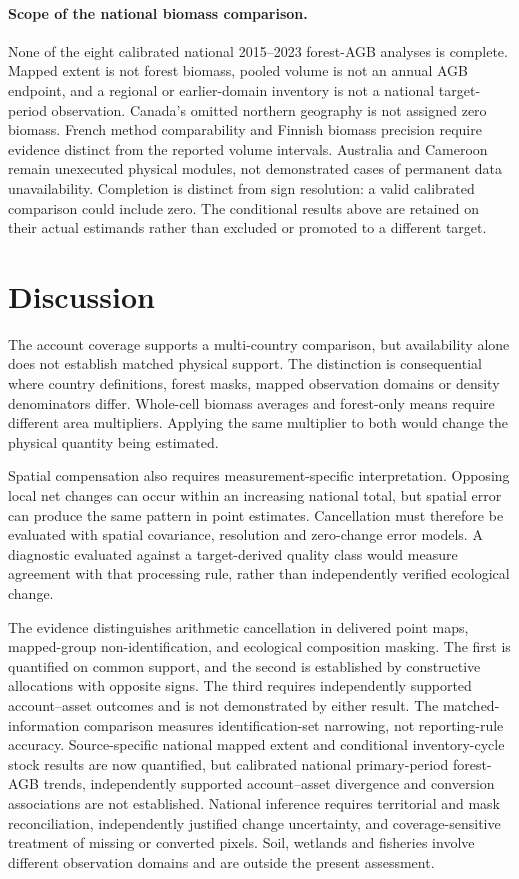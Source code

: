 \documentclass[11pt,a4paper]{article}
\begin{document}
\paragraph{Scope of the national biomass comparison.}
None of the eight calibrated national 2015--2023 forest-AGB analyses is complete. Mapped extent is not forest biomass, pooled volume is not an annual AGB endpoint, and a regional or earlier-domain inventory is not a national target-period observation. Canada's omitted northern geography is not assigned zero biomass. French method comparability and Finnish biomass precision require evidence distinct from the reported volume intervals. Australia and Cameroon remain unexecuted physical modules, not demonstrated cases of permanent data unavailability. Completion is distinct from sign resolution: a valid calibrated comparison could include zero. The conditional results above are retained on their actual estimands rather than excluded or promoted to a different target.

\section{Discussion}
The account coverage supports a multi-country comparison, but availability alone does not establish matched physical support. The distinction is consequential where country definitions, forest masks, mapped observation domains or density denominators differ. Whole-cell biomass averages and forest-only means require different area multipliers. Applying the same multiplier to both would change the physical quantity being estimated.

Spatial compensation also requires measurement-specific interpretation. Opposing local net changes can occur within an increasing national total, but spatial error can produce the same pattern in point estimates. Cancellation must therefore be evaluated with spatial covariance, resolution and zero-change error models. A diagnostic evaluated against a target-derived quality class would measure agreement with that processing rule, rather than independently verified ecological change.

The evidence distinguishes arithmetic cancellation in delivered point maps, mapped-group non-identification, and ecological composition masking. The first is quantified on common support, and the second is established by constructive allocations with opposite signs. The third requires independently supported account--asset outcomes and is not demonstrated by either result. The matched-information comparison measures identification-set narrowing, not reporting-rule accuracy. Source-specific national mapped extent and conditional inventory-cycle stock results are now quantified, but calibrated national primary-period forest-AGB trends, independently supported account--asset divergence and conversion associations are not established. National inference requires territorial and mask reconciliation, independently justified change uncertainty, and coverage-sensitive treatment of missing or converted pixels. Soil, wetlands and fisheries involve different observation domains and are outside the present assessment.
\end{document}
